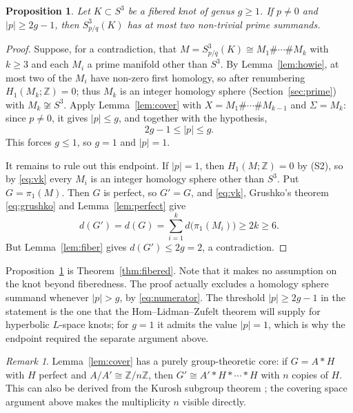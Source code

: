 \documentclass[12pt]{article}
\newcommand{\Z}{\mathbb Z}
\newcommand{\Surg}[2]{S^3_{#1}(#2)}
\newcommand{\rk}{d}
\newtheorem{proposition}[theorem]{Proposition}
\theoremstyle{definition}
\theoremstyle{remark}
\newtheorem{remark}[theorem]{Remark}
\begin{document}
\begin{proposition}\label{prop:large}
Let \(K\subset S^3\) be a fibered knot of genus \(g\geq1\). If
\(p\neq0\) and \(|p|\geq2g-1\), then \(\Surg{p/q}{K}\) has at most two
non-trivial prime summands.
\end{proposition}

\begin{proof}
Suppose, for a contradiction, that \(M=\Surg{p/q}{K}\cong M_1\#\cdots\#M_k\)
with \(k\geq3\) and each \(M_i\) a prime manifold other than \(S^3\). By
Lemma~\ref{lem:howie}, at most two of the \(M_i\) have non-zero first
homology, so after renumbering \(H_1(M_k;\Z)=0\); thus \(M_k\) is an
integer homology sphere (Section~\ref{sec:prime}) with
\(M_k\not\cong S^3\). Apply Lemma~\ref{lem:cover} with
\(X=M_1\#\cdots\#M_{k-1}\) and \(\Sigma=M_k\): since \(p\neq0\), it gives
\(|p|\leq g\), and together with the hypothesis,
\[
 2g-1\leq|p|\leq g .
\]
This forces \(g\leq1\), so \(g=1\) and \(|p|=1\).

It remains to rule out this endpoint. If \(|p|=1\), then
\(H_1(M;\Z)=0\) by (S2), so by \eqref{eq:vk} every \(M_i\) is an integer
homology sphere other than \(S^3\). Put \(G=\pi_1(M)\). Then \(G\) is
perfect, so \(G'=G\), and \eqref{eq:vk}, Grushko's theorem
\eqref{eq:grushko} and Lemma~\ref{lem:perfect} give
\[
 \rk(G')=\rk(G)=\sum_{i=1}^k\rk\bigl(\pi_1(M_i)\bigr)\geq2k\geq6.
\]
But Lemma~\ref{lem:fiber} gives \(\rk(G')\leq2g=2\), a contradiction.
\end{proof}

Proposition~\ref{prop:large} is Theorem~\ref{thm:fibered}. Note that it
makes no assumption on the knot beyond fiberedness. The proof actually
excludes a homology sphere summand whenever \(|p|>g\), by
\eqref{eq:numerator}. The threshold \(|p|\geq 2g-1\) in the statement is
the one that the Hom--Lidman--Zufelt theorem will supply for hyperbolic
\(L\)-space knots; for \(g=1\) it admits the value \(|p|=1\), which is
why the endpoint required the separate argument above.

\begin{remark}\label{rem:algebraic}
Lemma~\ref{lem:cover} has a purely group-theoretic core: if \(G=A*H\)
with \(H\) perfect and \(A/A'\cong\Z/n\Z\), then
\(G'\cong A'*H*\cdots*H\) with \(n\) copies of \(H\). This can also be
derived from the Kurosh subgroup theorem \cite{Kurosh1934}; the covering
space argument above makes the multiplicity \(n\) visible directly.
\end{remark}
\end{document}
